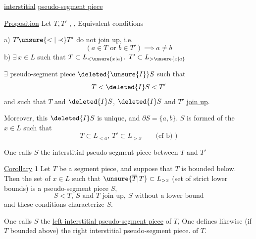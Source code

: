 \uline{interstitial} \uline{pseudo-segment piece}

\uline{Proposition} Let $T,T'$ , , Equivalent conditions  

a) $T\unsure{<|\prec}T'$  do not join up, i.e.
\[
(a\in T\text{ or }b\in T')\implies a\neq b
\]
\quad b) $\exists\,x\in L$ such that $T\subset L_{<\unsure{x|a}},\ T'\subset L_{>\unsure{x|a}}$

 $\exists$ pseudo-segment piece $\deleted{\unsure{I}}S$ such that
\[
T<\deleted{I}S<T'
\]
and such that $T$ and $\deleted{I}S$, $\deleted{I}S$ and $T'$ \uline{join up}.

Moreover, this $\deleted{I}S$ is unique, and $\partial S=\{a,b\}$. $S$ is formed of the $x\in L$ such that
\[
T\subset L_{<a},\ T'\subset L_{>x}\qquad\text{(cf b) )}
\]

One calls $S$ the interstitial pseudo-segment piece between $T$ and $T'$

\uline{Corollary} 1 Let $T$ be a segment piece, and suppose that $T$ is  bounded below. Then the set of   $x\in L$ such that $\unsure{\overline T|T}\subset L_{>x}$ (set of strict lower bounds) is a  pseudo-segment piece $S$,  
\begingroup
\makeatletter
\tagsleft@true
\makeatother
\[
S<T,\ S\text{ and }T\text{ join up},\ S\text{ without a lower bound}\tag*{\(\ast\))}
\]
\endgroup
and these conditions  characterize $S$.

 One calls $S$ the \uline{left interstitial pseudo-segment piece} of $T$, One defines likewise (if $T$ bounded above) the right interstitial pseudo-segment piece. of $T$.
